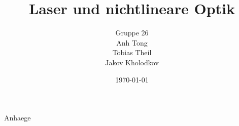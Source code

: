 \documentclass[11pt,a4paper]{scrartcl}
\title{Laser und nichtlineare Optik}
\author{Gruppe 26\\ Anh Tong \\ Tobias Theil \\Jakov Kholodkov}
\date{\today}
\begin{document}
	
\maketitle
\tableofcontents



\newpage




%

Anhaege


 
\end{document}
